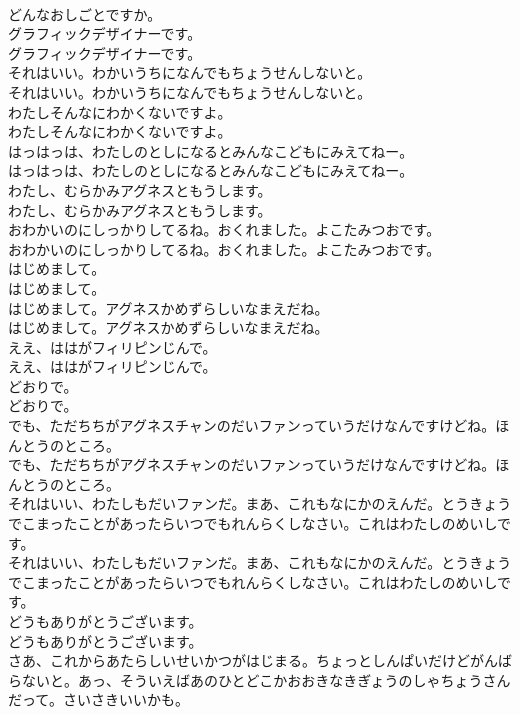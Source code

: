 \documentclass[8pt]{extreport}
\begin{document}
\begin{CJK}{UTF8}{min}
\\	どんなおしごとですか。
\\	グラフィックデザイナーです。
\\	グラフィックデザイナーです。
\\	それはいい。わかいうちになんでもちょうせんしないと。
\\	それはいい。わかいうちになんでもちょうせんしないと。
\\	わたしそんなにわかくないですよ。
\\	わたしそんなにわかくないですよ。
\\	はっはっは、わたしのとしになるとみんなこどもにみえてねー。
\\	はっはっは、わたしのとしになるとみんなこどもにみえてねー。
\\	わたし、むらかみアグネスともうします。
\\	わたし、むらかみアグネスともうします。
\\	おわかいのにしっかりしてるね。おくれました。よこたみつおです。
\\	おわかいのにしっかりしてるね。おくれました。よこたみつおです。
\\	はじめまして。
\\	はじめまして。
\\	はじめまして。アグネスかめずらしいなまえだね。
\\	はじめまして。アグネスかめずらしいなまえだね。
\\	ええ、ははがフィリピンじんで。
\\	ええ、ははがフィリピンじんで。
\\	どおりで。
\\	どおりで。
\\	でも、ただちちがアグネスチャンのだいファンっていうだけなんですけどね。ほんとうのところ。
\\	でも、ただちちがアグネスチャンのだいファンっていうだけなんですけどね。ほんとうのところ。
\\	それはいい、わたしもだいファンだ。まあ、これもなにかのえんだ。とうきょうでこまったことがあったらいつでもれんらくしなさい。これはわたしのめいしです。
\\	それはいい、わたしもだいファンだ。まあ、これもなにかのえんだ。とうきょうでこまったことがあったらいつでもれんらくしなさい。これはわたしのめいしです。
\\	どうもありがとうございます。
\\	どうもありがとうございます。
\\	さあ、これからあたらしいせいかつがはじまる。ちょっとしんぱいだけどがんばらないと。あっ、そういえばあのひとどこかおおきなきぎょうのしゃちょうさんだって。さいさきいいかも。

\end{CJK}
\end{document}
